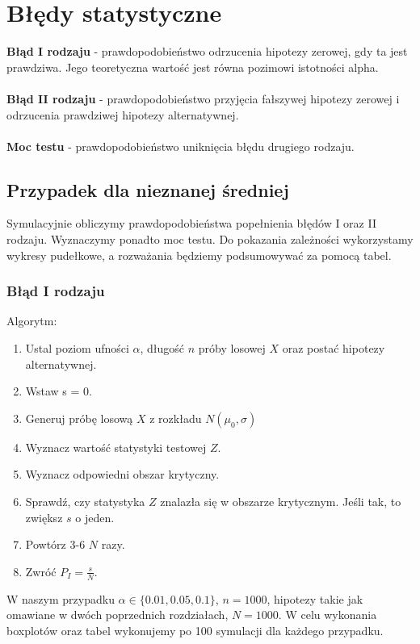 \documentclass{article}
\theoremstyle{break}
\begin{document}
\section{Błędy statystyczne}
\textbf{Błąd I rodzaju} - prawdopodobieństwo odrzucenia hipotezy zerowej, gdy ta jest prawdziwa. Jego teoretyczna wartość jest równa pozimowi istotności alpha.\\ \\
\textbf{Błąd II rodzaju} - prawdopodobieństwo przyjęcia fałszywej hipotezy zerowej i odrzucenia prawdziwej hipotezy alternatywnej.\\ \\ 
\textbf{Moc testu} - prawdopodobieństwo uniknięcia błędu drugiego rodzaju.

\subsection*{Przypadek dla nieznanej średniej} 

Symulacyjnie obliczymy prawdopodobieństwa popełnienia błędów I oraz II rodzaju. Wyznaczymy ponadto moc testu. Do pokazania zależności wykorzystamy wykresy pudełkowe, a rozważania będziemy podsumowywać za pomocą tabel.

\subsubsection*{Błąd I rodzaju}

Algorytm:

\begin{enumerate}
\item Ustal poziom ufności $\alpha$, długość $n$ próby losowej $X$ oraz postać hipotezy alternatywnej.
\item Wstaw s = 0.
\item Generuj próbę losową $X$ z rozkładu $N(\mu_0, \sigma)$
\item Wyznacz wartość statystyki testowej $Z$.
\item Wyznacz odpowiedni obszar krytyczny.
\item Sprawdź, czy statystyka $Z$ znalazła się w obszarze krytycznym. Jeśli tak, to zwiększ $s$ o jeden.
\item Powtórz 3-6 $N$ razy.
\item Zwróć $P_I = \frac{s}{N}.$ 
\end{enumerate}


W naszym przypadku $\alpha \in \{0.01, 0.05, 0.1\}$, $n=1000$, hipotezy takie jak omawiane w dwóch poprzednich rozdziałach, $N=1000$.
W celu wykonania boxplotów oraz tabel wykonujemy po 100 symulacji dla każdego przypadku.
\end{document}
